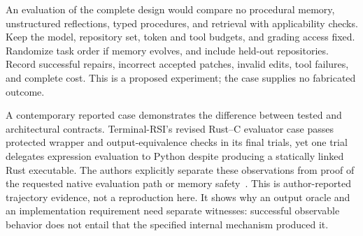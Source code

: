 An evaluation of the complete design would compare no procedural memory, unstructured reflections, typed procedures, and retrieval with applicability checks. Keep the model, repository set, token and tool budgets, and grading access fixed. Randomize task order if memory evolves, and include held-out repositories. Record successful repairs, incorrect accepted patches, invalid edits, tool failures, and complete cost. This is a proposed experiment; the case supplies no fabricated outcome.

A contemporary reported case demonstrates the difference between tested and architectural contracts. Terminal-RSI's revised Rust--C evaluator case passes protected wrapper and output-equivalence checks in its final trials, yet one trial delegates expression evaluation to Python despite producing a statically linked Rust executable. The authors explicitly separate these observations from proof of the requested native evaluation path or memory safety~\cite{cumulative_c_terminalrsi_v2}. This is author-reported trajectory evidence, not a reproduction here. It shows why an output oracle and an implementation requirement need separate witnesses: successful observable behavior does not entail that the specified internal mechanism produced it.


